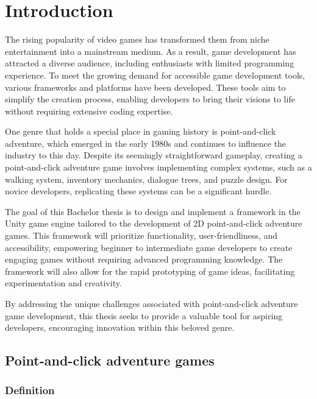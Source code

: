 \chapter{Introduction}

The rising popularity of video games has transformed them from niche entertainment into a mainstream medium. As a result, game development has attracted a diverse audience, including enthusiasts with limited programming experience. To meet the growing demand for accessible game development tools, various frameworks and platforms have been developed. These tools aim to simplify the creation process, enabling developers to bring their visions to life without requiring extensive coding expertise.

One genre that holds a special place in gaming history is point-and-click adventure, which emerged in the early 1980s and continues to influence the industry to this day. Despite its seemingly straightforward gameplay, creating a point-and-click adventure game involves implementing complex systems, such as a walking system, inventory mechanics, dialogue trees, and puzzle design. For novice developers, replicating these systems can be a significant hurdle.

The goal of this Bachelor thesis is to design and implement a framework in the Unity game engine tailored to the development of 2D point-and-click adventure games. This framework will prioritize functionality, user-friendliness, and accessibility, empowering beginner to intermediate game developers to create engaging games without requiring advanced programming knowledge. The framework will also allow for the rapid prototyping of game ideas, facilitating experimentation and creativity.

By addressing the unique challenges associated with point-and-click adventure game development, this thesis seeks to provide a valuable tool for aspiring developers, encouraging innovation within this beloved genre.

\section{Point-and-click adventure games}
\subsection{Definition}



